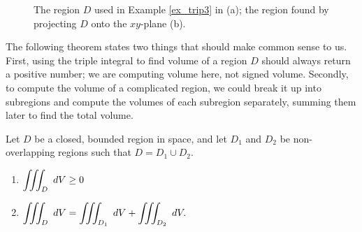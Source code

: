 \begin{example}
\begin{figure}[H]
\caption{The region $D$ used in Example \ref{ex_trip3} in (a); the region found by projecting $D$ onto the $xy$-plane (b). %
}
\end{figure}


\end{example}

The following theorem states two things that should make common sense to us. First, using the triple integral to find volume of a region $D$ should always return a positive number; we are computing volume here, not signed volume. Secondly, to compute the volume of a complicated region, we could break it up into subregions and compute the volumes of each subregion separately, summing them later to find the total volume.

\begin{theorem}
\label{thm:triple_int_prop}
Let $D$ be a closed, bounded region in space, and let $D_1$ and $D_2$ be non-overlapping regions such that $D=D_1 \cup D_2$.
\begin{enumerate}
	\item $\displaystyle \iiint_D \ dV \geq 0$
	\item	$\displaystyle \iiint_D\ dV = \iiint_{D_1}\ dV + \iiint_{D_2}\ dV.$
\end{enumerate}
\end{theorem}


